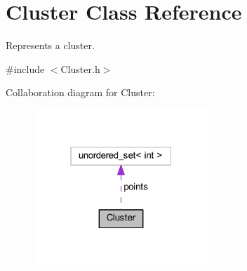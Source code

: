 \hypertarget{class_cluster}{}\section{Cluster Class Reference}
\label{class_cluster}


Represents a cluster.  




{\ttfamily \#include $<$Cluster.\+h$>$}



Collaboration diagram for Cluster\+:
\nopagebreak
\begin{figure}[H]
\begin{center}
\leavevmode
\includegraphics[width=187pt]{class_cluster__coll__graph}
\end{center}
\end{figure}
